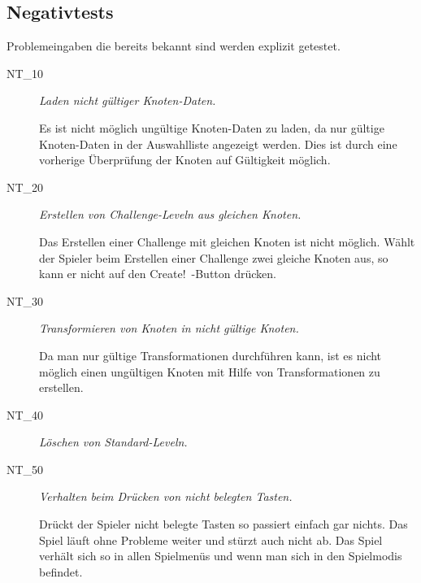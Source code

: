 %



\newpage



\subsection*{Negativtests}
\label{Abschnitt:Tests:Protokoll:Negativ}


Problemeingaben die bereits bekannt sind werden explizit getestet.\\

\begin{description}

	\item[NT\_10] \textit{Laden nicht gültiger Knoten-Daten.} \hfill\\
	
	\label{NT:10}
	
	Es ist nicht möglich ungültige Knoten-Daten zu laden, da nur gültige Knoten-Daten in der Auswahlliste angezeigt werden. Dies ist durch eine vorherige Überprüfung der Knoten auf Gültigkeit  möglich.
	
	\item[NT\_20] \textit{Erstellen von Challenge-Leveln aus gleichen Knoten.} \hfill\\
	
	\label{NT:20}
	
	Das Erstellen einer Challenge mit gleichen Knoten ist nicht möglich. Wählt der Spieler beim Erstellen einer Challenge zwei gleiche Knoten aus, so kann er nicht auf den \glqq Create!\grqq~-Button drücken.
	
	
	
	\item[NT\_30] \textit{Transformieren von Knoten in nicht gültige Knoten.} \hfill\\
	
	\label{NT:30}
	
	Da man nur gültige Transformationen durchführen kann, ist es nicht möglich einen ungültigen Knoten mit Hilfe von Transformationen zu erstellen.
	
	\item[NT\_40] \textit{Löschen von Standard-Leveln.} \hfill\\
	
	\label{NT:40}
	
	\item[NT\_50] \textit{Verhalten beim Drücken von nicht belegten Tasten.} \hfill\\
	
	\label{NT:50}	
	
	Drückt der Spieler nicht belegte Tasten so passiert einfach gar nichts. Das Spiel läuft ohne Probleme weiter und stürzt auch nicht ab. Das Spiel verhält sich so in allen Spielmenüs und wenn man sich in den Spielmodis befindet. 
	
\end{description}





